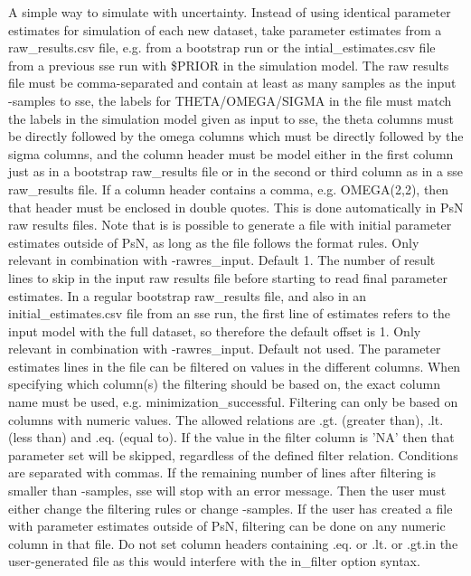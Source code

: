 \begin{optionlist}
\nextopt
{}
A simple way to simulate with uncertainty. Instead of using identical parameter estimates for simulation of each new dataset, take parameter estimates from a raw\_results.csv file, e.g. from a bootstrap run or the intial\_estimates.csv file from a previous sse run with \$PRIOR in the simulation model. The raw results file must be comma-separated and contain at least as many samples as the input -samples to sse, the labels for  THETA/OMEGA/SIGMA in the file must match the labels in the simulation model given as input to sse, the theta columns must be directly followed by the omega columns which must be directly followed by the sigma columns, and the column header must be model either in the first column just as in a bootstrap raw\_results file or in the second or third column as in a sse raw\_results file. If a column header contains a comma, e.g. OMEGA(2,2), then that header must be enclosed in double quotes. This is done automatically in PsN raw results files. Note that is is possible to generate a file with initial parameter estimates outside of PsN, as long as the file follows the format rules. 
\nextopt
{}
Only relevant in combination with -rawres\_input. Default 1. The number of result lines to skip in the input raw results file before starting to read final parameter estimates. In a regular bootstrap raw\_results file, and also in an initial\_estimates.csv file from an sse run, the first line of estimates refers to the input model with the full dataset, so therefore the default offset is 1. 
\nextopt
{}
Only relevant in combination with -rawres\_input. Default not used. The parameter estimates lines in the file can be filtered on values in the different columns. When specifying which column(s) the filtering should be based on, the exact column name must be used, e.g. minimization\_successful. Filtering can only be based on columns with numeric values. The allowed relations are .gt. (greater than), .lt. (less than) and .eq. (equal to). If the value in the filter column is 'NA' then that parameter set will be skipped, regardless of the defined filter relation. Conditions are separated with commas. If the remaining number of lines after filtering is smaller than -samples, sse will stop with an error message. Then the user must either change the filtering rules or change -samples. If the user has created a file with parameter estimates outside of PsN, filtering can be done on any numeric column in that file. Do not set column headers containing .eq. or .lt. or .gt.in the user-generated file as this would interfere with the in\_filter option syntax.


\end{optionlist}

